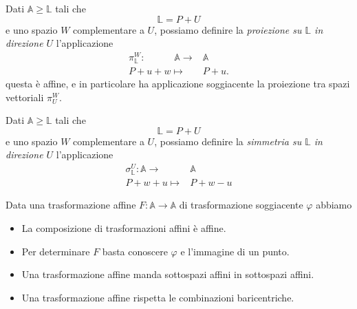 \documentclass[11pt]{scrartcl}
\begin{document}
   	 \begin{example}[Proiezione]
   	 	Dati $\mathbb{A}\ge \mathbb{L}$ tali che 
   	 	$$\mathbb{L}=P+U$$
   	 	e uno spazio $W$ complementare a $U$, possiamo definire la \textit{proiezione su $\mathbb{L}$ in direzione $U$} l'applicazione
   	 	\begin{align*}
   	 		\pi_{\mathbb{L}}^W:\qquad\quad \mathbb{A}\longrightarrow & \mathbb{A} \\
   	 		P +u+w \longmapsto & P+u.
   	 	\end{align*}
   	 	questa è affine, e in particolare ha applicazione soggiacente la proiezione tra spazi vettoriali $\pi_U^W$.
   	 \end{example}
   	 \begin{example}[Simmetria]
   	 	Dati $\mathbb{A}\ge \mathbb{L}$ tali che 
   	 	$$\mathbb{L}=P+U$$
   	 	e uno spazio $W$ complementare a $U$, possiamo definire la \textit{simmetria su $\mathbb{L}$ in direzione $U$} l'applicazione
   	 	\begin{align*}
   	 		\sigma_\mathbb{L}^U:\mathbb{A}\longrightarrow & \mathbb{A} \\
   	 		P+w+u \longmapsto & P+w-u
   	 	\end{align*}
   	 \end{example}
   	 \begin{lemma}
   	 	Data una trasformazione affine $F:\mathbb{A}\to\mathbb{A}$ di trasformazione soggiacente $\varphi$ abbiamo
   	 	\begin{itemize}
   	 		\item La composizione di trasformazioni affini è affine.
   	 		\item Per determinare $F$ basta conoscere $\varphi$ e l'immagine di un punto.
   	 		\item Una trasformazione affine manda sottospazi affini in sottospazi affini.
   	 		\item Una trasformazione affine rispetta le combinazioni baricentriche.
   	 	\end{itemize}
   	 \end{lemma}
\end{document}

